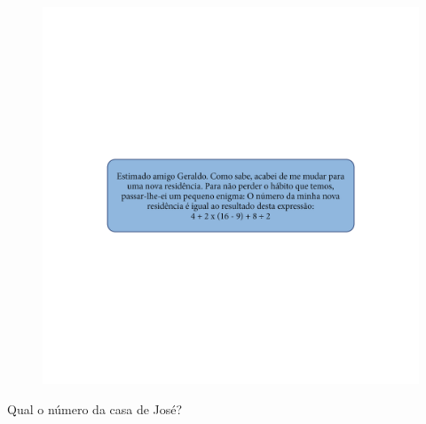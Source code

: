 \begin{figure}[htpb!]
\includegraphics[width=\textwidth]{../ilustracoes/MAT5/SAEB_5ANO_MAT_figura124.png}
\end{figure}


Qual o número da casa de José?

